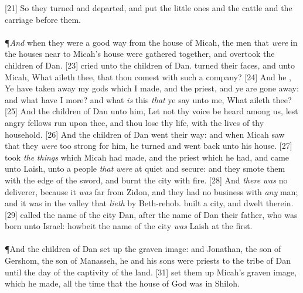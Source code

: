 [21] \textcolor[cmyk]{0.99998,1,0,0}{So they turned and departed, and put the little ones and the cattle and the carriage before them.}\\
\\
\P \textcolor[cmyk]{0.99998,1,0,0}{\emph{And} when they were a good way from the house of Micah, the men that \emph{were} in the houses near to Micah's house were gathered together, and overtook the children of Dan.}
[23] \textcolor[cmyk]{0.99998,1,0,0}{ cried unto the children of Dan.  turned their faces, and  unto Micah, What aileth thee, that thou comest with such a company?}
[24] \textcolor[cmyk]{0.99998,1,0,0}{And he , Ye have taken away my gods which I made, and the priest, and ye are gone away: and what have I more? and what \emph{is} this \emph{that} ye say unto me, What aileth thee?}
[25] \textcolor[cmyk]{0.99998,1,0,0}{And the children of Dan  unto him, Let not thy voice be heard among us, lest angry fellows run upon thee, and thou lose thy life, with the lives of thy household.}
[26] \textcolor[cmyk]{0.99998,1,0,0}{And the children of Dan went their way: and when Micah saw that they \emph{were} too strong for him, he turned and went back unto his house.}
[27] \textcolor[cmyk]{0.99998,1,0,0}{ took \emph{the} \emph{things} which Micah had made, and the priest which he had, and came unto Laish, unto a people \emph{that} \emph{were} at quiet and secure: and they smote them with the edge of the sword, and burnt the city with fire.}
[28] \textcolor[cmyk]{0.99998,1,0,0}{And \emph{there} \emph{was} no deliverer, because it \emph{was} far from Zidon, and they had no business with \emph{any} man; and it was in the valley that \emph{lieth} by Beth-rehob.  built a city, and dwelt therein.}
[29] \textcolor[cmyk]{0.99998,1,0,0}{ called the name of the city Dan, after the name of Dan their father, who was born unto Israel: howbeit the name of the city \emph{was} Laish at the first.}\\
\\
\P \textcolor[cmyk]{0.99998,1,0,0}{And the children of Dan set up the graven image: and Jonathan, the son of Gershom, the son of Manasseh, he and his sons were priests to the tribe of Dan until the day of the captivity of the land.}
[31] \textcolor[cmyk]{0.99998,1,0,0}{ set them up Micah's graven image, which he made, all the time that the house of God was in Shiloh.}